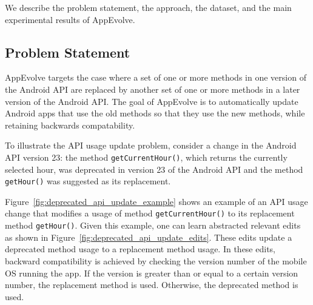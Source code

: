 We describe the problem statement, the approach, the dataset, and the main experimental results of AppEvolve.

\subsection{Problem Statement}\label{sec:problem}

AppEvolve targets the case where a set of one or more methods in one
version of the Android API are replaced by another set of one or more
methods in a later version of the Android API.  The goal of AppEvolve is to
automatically update Android apps that use the old methods so that they use
the new methods, while retaining backwards compatability.


To illustrate the API usage update problem, consider a change in the Android API version 23: the method \texttt{getCurrentHour()}, which returns the currently selected hour, was deprecated in version 23 of the Android API and the method \texttt{getHour()} was suggested as its replacement. 

Figure~\ref{fig:deprecated_api_update_example} shows an example of an API
usage change that modifies a usage of method \texttt{getCurrentHour()} to
its replacement method \texttt{getHour()}. Given this example, one can
learn abstracted relevant edits as shown in
Figure~\ref{fig:deprecated_api_update_edits}. These edits update a
deprecated method usage to a replacement method usage. In these edits,
backward compatibility is achieved by checking the version number of the
mobile OS running the app. If the version is greater than or equal to a
certain version number, the replacement method is used. Otherwise, the
deprecated method is used.

